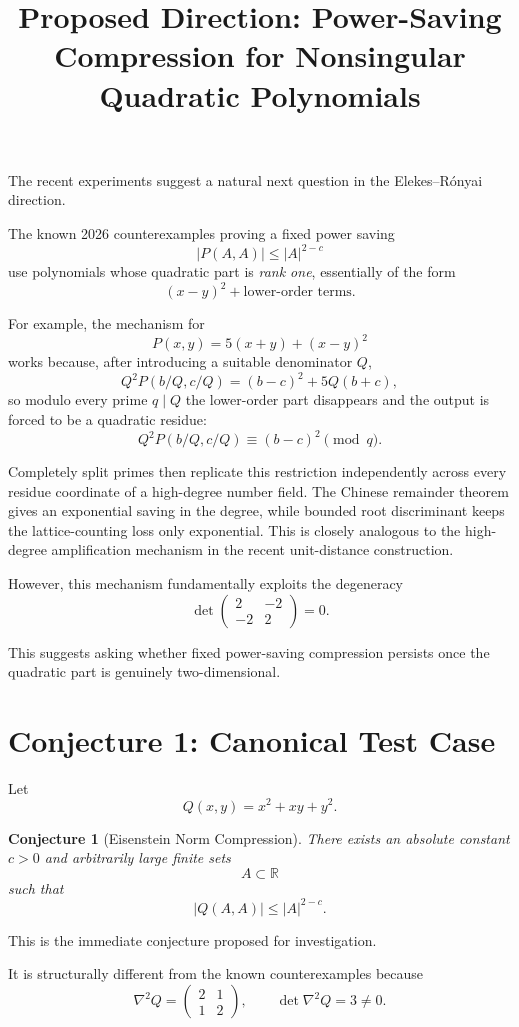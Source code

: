 \documentclass[11pt]{article}
\title{Proposed Direction: Power-Saving Compression for Nonsingular Quadratic Polynomials}
\author{}
\date{}
\newtheorem{conjecture}{Conjecture}
\begin{document}
\maketitle

The recent experiments suggest a natural next question in the Elekes--R\'onyai direction.

The known 2026 counterexamples proving a fixed power saving
\[
|P(A,A)|\le |A|^{2-c}
\]
use polynomials whose quadratic part is \emph{rank one}, essentially of the form
\[
(x-y)^2+\text{lower-order terms}.
\]

For example, the mechanism for
\[
P(x,y)=5(x+y)+(x-y)^2
\]
works because, after introducing a suitable denominator \(Q\),
\[
Q^2P(b/Q,c/Q)
=
(b-c)^2+5Q(b+c),
\]
so modulo every prime \(q\mid Q\) the lower-order part disappears and the output is forced to be a quadratic residue:
\[
Q^2P(b/Q,c/Q)\equiv (b-c)^2\pmod q.
\]

Completely split primes then replicate this restriction independently across every residue coordinate of a high-degree number field. The Chinese remainder theorem gives an exponential saving in the degree, while bounded root discriminant keeps the lattice-counting loss only exponential. This is closely analogous to the high-degree amplification mechanism in the recent unit-distance construction.

However, this mechanism fundamentally exploits the degeneracy
\[
\det
\begin{pmatrix}
2&-2\\
-2&2
\end{pmatrix}
=0.
\]

This suggests asking whether fixed power-saving compression persists once the quadratic part is genuinely two-dimensional.

\section{Conjecture 1: Canonical Test Case}

Let
\[
Q(x,y)=x^2+xy+y^2.
\]

\begin{conjecture}[Eisenstein Norm Compression]
There exists an absolute constant \(c>0\) and arbitrarily large finite sets
\[
A\subset\mathbb R
\]
such that
\[
\boxed{
|Q(A,A)|\le |A|^{2-c}.
}
\]
\end{conjecture}

This is the immediate conjecture proposed for investigation.

It is structurally different from the known counterexamples because
\[
\nabla^2Q=
\begin{pmatrix}
2&1\\
1&2
\end{pmatrix},
\qquad
\det\nabla^2Q=3\neq0.
\]
\end{document}
